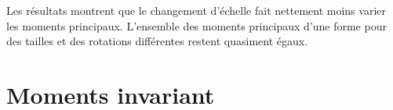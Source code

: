 \documentclass{article}
\begin{document}
  Les résultats montrent que le changement d'échelle fait nettement moins varier les moments
  principaux. L'ensemble des moments principaux d'une forme pour des tailles et des rotations
  différentes restent quasiment égaux.\\
  
  \section{Moments invariant}
  
    
\end{document}

